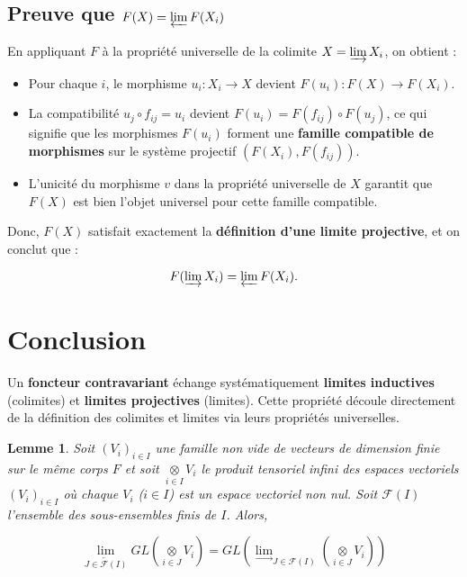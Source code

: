 \documentclass{article}
\newtheorem{mylemma}{Lemme}
\begin{document}
	\subsection{Preuve que \( F(X) = \varprojlim F(X_i) \)}
	En appliquant \( F \) \`a la propri\'et\'e universelle de la colimite \( X = \varinjlim X_i \), on obtient :
	\begin{itemize}
		\item Pour chaque \( i \), le morphisme \( u_i: X_i \to X \) devient \( F(u_i): F(X) \to F(X_i) \).
		\item La compatibilit\'e \( u_j \circ f_{ij} = u_i \) devient \( F(u_i) = F(f_{ij}) \circ F(u_j) \), ce qui signifie que les morphismes \( F(u_i) \) forment une \textbf{famille compatible de morphismes} sur le syst\`eme projectif \( (F(X_i), F(f_{ij})) \).
		\item L’unicit\'e du morphisme \( v \) dans la propri\'et\'e universelle de \( X \) garantit que \( F(X) \) est bien l’objet universel pour cette famille compatible.
	\end{itemize}
	
	Donc, \( F(X) \) satisfait exactement la \textbf{d\'efinition d’une limite projective}, et on conclut que :
	
	\[
	F(\varinjlim X_i) = \varprojlim F(X_i).
	\]
	
	\section{Conclusion}
	Un \textbf{foncteur contravariant} \'echange syst\'ematiquement \textbf{limites inductives} (colimites) et \textbf{limites projectives} (limites). Cette propri\'et\'e d\'ecoule directement de la d\'efinition des colimites et limites via leurs propri\'et\'es universelles.
	
	\begin{mylemma}\label{lem1}
		Soit $(V_i)_{i\in I}$ une famille non vide de vecteurs de dimension finie sur le même corps \( F \) et soit \( \underset{i\in I}\otimes V_i \) le produit tensoriel infini des espaces vectoriels \( (V_i)_{i\in I} \) où chaque \( V_i \) (\( i \in I \)) est un espace vectoriel non nul. Soit \( \mathcal{F}(I) \) l'ensemble des sous-ensembles finis de \( I \). Alors, 
		
		\[
		\underset{\overleftarrow{J \in \mathcal{F}(I)}}{\lim} GL\left( \underset{i \in J}{\otimes} V_i \right) = GL\left( \underset{\longrightarrow}{\lim}_{J \in \mathcal{F}(I)} \left( \underset{i \in J}{\otimes} V_i \right) \right)
		\]
	\end{mylemma}
	
\end{document}
